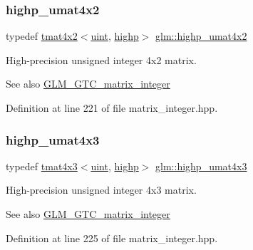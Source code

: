 \subsubsection{\texorpdfstring{highp\_umat4x2}{highp\_umat4x2}}
{\footnotesize\ttfamily typedef \mbox{\hyperlink{structglm_1_1tmat4x2}{tmat4x2}}$<$\mbox{\hyperlink{group__core__precision_ga4fd29415871152bfb5abd588334147c8}{uint}}, \mbox{\hyperlink{namespaceglm_a0f04f086094c747d227af4425893f545ac6f7eab42eacbb10d59a58e95e362074}{highp}}$>$ \mbox{\hyperlink{group__gtc__matrix__integer_ga4015bf99a981bf271fd516f9b2cb6724}{glm\+::highp\+\_\+umat4x2}}}

High-\/precision unsigned integer 4x2 matrix. \begin{DoxySeeAlso}{See also}
\mbox{\hyperlink{group__gtc__matrix__integer}{G\+L\+M\+\_\+\+G\+T\+C\+\_\+matrix\+\_\+integer}} 
\end{DoxySeeAlso}


Definition at line 221 of file matrix\+\_\+integer.\+hpp.

\mbox{\label{group__gtc__matrix__integer_gaa394320db559302e18c8b64013b8d7fb}} 
\subsubsection{\texorpdfstring{highp\_umat4x3}{highp\_umat4x3}}
{\footnotesize\ttfamily typedef \mbox{\hyperlink{structglm_1_1tmat4x3}{tmat4x3}}$<$\mbox{\hyperlink{group__core__precision_ga4fd29415871152bfb5abd588334147c8}{uint}}, \mbox{\hyperlink{namespaceglm_a0f04f086094c747d227af4425893f545ac6f7eab42eacbb10d59a58e95e362074}{highp}}$>$ \mbox{\hyperlink{group__gtc__matrix__integer_gaa394320db559302e18c8b64013b8d7fb}{glm\+::highp\+\_\+umat4x3}}}

High-\/precision unsigned integer 4x3 matrix. \begin{DoxySeeAlso}{See also}
\mbox{\hyperlink{group__gtc__matrix__integer}{G\+L\+M\+\_\+\+G\+T\+C\+\_\+matrix\+\_\+integer}} 
\end{DoxySeeAlso}


Definition at line 225 of file matrix\+\_\+integer.\+hpp.

\mbox{\label{group__gtc__matrix__integer_gaf5365128f6fd506442843fb5a441f385}} 
